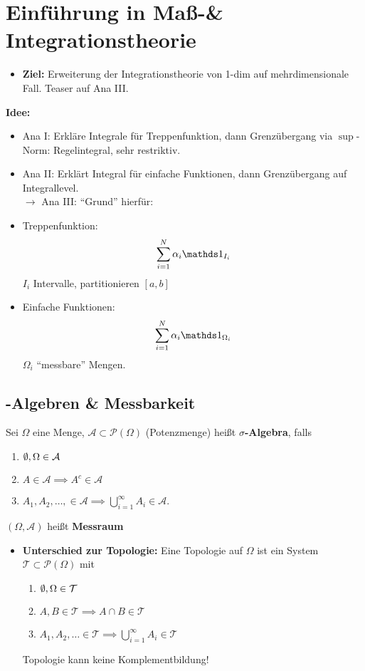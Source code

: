 \section{Einführung in Maß-\& Integrationstheorie}
\begin{itemize}
	\item \textbf{Ziel:} Erweiterung der Integrationstheorie von 1-dim auf mehrdimensionale Fall.
		Teaser auf Ana III.
\end{itemize}
\textbf{Idee:}
\begin{itemize}
	\item Ana I: Erkläre Integrale für Treppenfunktion, dann Grenzübergang via $ \sup $-Norm: Regelintegral, sehr restriktiv.
	\item Ana II: Erklärt Integral für einfache Funktionen, dann Grenzübergang auf Integrallevel.\\
		$ \to  $ Ana III: ``Grund'' hierfür:
	\item Treppenfunktion:
		\[
			\sum_{i=1}^{N} \alpha_i \I_{I_i} 
		\]
		$ I_i $ Intervalle, partitionieren $ [a, b] $ 
	\item Einfache Funktionen:
		\[
			\sum_{i=1}^{N} \alpha_i \I_{\Omega_i} 
		\]
		$ \Omega_i $ ``messbare'' Mengen.
\end{itemize}

\subsection{\mathsec{\sigma}{}-Algebren \& Messbarkeit}
\begin{definition}
	Sei $ \Omega  $ eine Menge, $ \mathcal{A} \subset \mathcal{P} (\Omega) $ (Potenzmenge) heißt \textbf{$ \sigma $-Algebra}, falls
	\begin{enumerate}[label=(\roman*)]
		\item $ \emptyset , \Omega \in \mathcal{A}  $ 
		\item $ A \in \mathcal{A} \implies A^c \in \mathcal{A}  $ 
		\item $ A_1, A_2, \dotsc, \in \mathcal{A} \implies \bigcup_{i = 1} ^{\infty} A_i \in \mathcal{A}  $.
	\end{enumerate}
	$ (\Omega, \mathcal{A} ) $ heißt \textbf{Messraum}
\end{definition}
\begin{itemize}
	\item \textbf{Unterschied zur Topologie:} Eine Topologie auf $ \Omega $ ist ein System $ \mathcal{T} \subset \mathcal{P} (\Omega) $ mit
		\begin{enumerate}[label=(\roman*)]
			\item $ \emptyset , \Omega \in \mathcal{T}  $ 
			\item $ A, B \in \mathcal{T} \implies A \cap B \in \mathcal{T}  $ 
			\item $ A_1, A_2, \dotsc \in \mathcal{T} \implies \bigcup_{i = 1} ^{\infty} A_i \in \mathcal{T}  $
		\end{enumerate}
		Topologie kann keine Komplementbildung!
\end{itemize}

